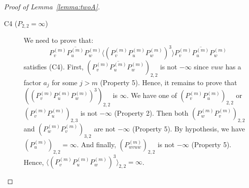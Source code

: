 \documentclass{lmcs}
\theoremstyle{remark}
\theoremstyle{remark}
\begin{document}
\begin{proof}[Proof of Lemma~\ref{lemma:twoA}]
\begin{description}
\item[C4 ($P_{2,2} = \infty$)] We need to prove that:
$$\overline{P^{(m)}_v P^{(m)}_u P^{(m)}_w} \langle (P^{(m)}_v P^{(m)}_u P^{(m)}_w)^3 \rangle \overline{P^{(m)}_v P^{(m)}_u P^{(m)}_w}$$
satisfies (C4).
First, $(\overline{P^{(m)}_v P^{(m)}_u P^{(m)}_w})_{2,2}$ is not $-\infty$ since $vuw$ has a factor $a_j$ for some $j>m$ (Property 5). Hence, it remains to prove that $((P^{(m)}_v P^{(m)}_u P^{(m)}_w)^3)_{2,2}$ is $\infty$. We have one of $(P^{(m)}_v P^{(m)}_u)_{2,2}$ or $(P^{(m)}_v P^{(m)}_u)_{2,3}$ is not $-\infty$ (Property 2). Then both $(P^{(m)}_w P^{(m)}_v)_{2,2}$ and $(P^{(m)}_w P^{(m)}_v)_{3,2}$ are not $-\infty$ (Property 5). By hypothesis, we have $(P^{(m)}_u)_{2,2} = \infty$. And finally, $(P^{(m)}_{wvuw})_{2,2}$ is not $-\infty$ (Property 5). Hence, $\langle (P^{(m)}_v P^{(m)}_u P^{(m)}_w)^3 \rangle_{2,2} = \infty$.\qedhere

\end{description}
\end{proof}
\end{document}
